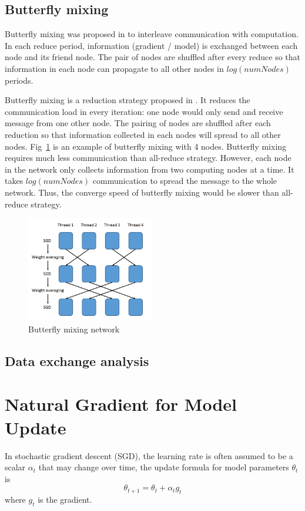 \documentclass{article}
\begin{document}
\subsection{Butterfly mixing}
Butterfly mixing was proposed in \cite{zhao2013butterfly} to interleave communication with computation. In each
reduce period, information (gradient / model) is exchanged between each node and its friend node. The pair of nodes
are shuffled after every reduce so that information in each node can propagate to all other nodes in $log(numNodes)$ periods.


Butterfly mixing is a reduction strategy proposed in \cite{zhao2013butterfly}. It reduces the communication load in 
every iteration: one node would only send and receive message from one other node. The pairing of nodes are shuffled after
each reduction so that information collected in each nodes will spread to all other nodes. Fig~\ref{fig:butterfly} 
is an example of butterfly mixing with 4 nodes. Butterfly mixing requires much less communication than all-reduce 
strategy. However, each node in the network only collects information from two computing nodes at a time.
It takes $log(numNodes)$ communication to spread the message to the whole network. Thus, the converge speed 
of butterfly mixing would be slower than all-reduce strategy. 
\begin{figure}[htb]
  \centering
  \includegraphics[width=0.5\textwidth]{butterfly.png}
  \caption{Butterfly mixing network}
  \label{fig:butterfly}
\end{figure}

\subsection{Data exchange analysis}

\section{Natural Gradient for Model Update}
In stochastic gradient descent (SGD), the learning rate is often assumed to be a scalar $\alpha_t$ that may change over time,
the update formula for model parameters $\theta_{t}$ is
\begin{equation}
\theta_{t+1} = \theta_{t} + \alpha_t g_t
\end{equation}
where $g_t$ is the gradient.
\end{document}
